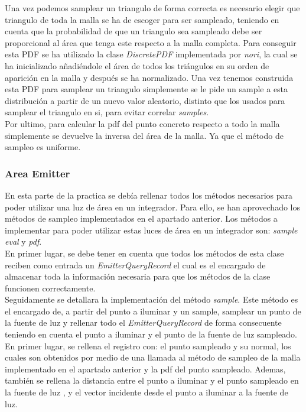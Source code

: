 \documentclass[10pt,oneside,a4paper]{article}
\begin{document}
Una vez podemos samplear un triangulo de forma correcta es necesario elegir que triangulo de toda la malla se ha de escoger para ser sampleado, teniendo en cuenta que la probabilidad de que un triangulo sea sampleado debe ser proporcional al área que tenga este respecto a la malla completa. Para conseguir esta PDF se ha utilizado la clase \textit{DiscretePDF} implementada por \textit{nori}, la cual se ha inicializado añadiéndole el área de todos los triángulos en su orden de aparición en la malla y después se ha normalizado. Una vez tenemos construida esta PDF para samplear un triangulo simplemente se le pide un sample a esta distribución a partir de un nuevo valor aleatorio, distinto que los usados para samplear el triangulo en si, para evitar correlar\textit{ samples}.\\

Por ultimo, para calcular la pdf del punto concreto respecto a todo la malla simplemente se devuelve la inversa del área de la malla. Ya que el método de sampleo es uniforme.
\subsubsection{Area Emitter}
En esta parte de la practica se debía rellenar todos los métodos necesarios para poder utilizar  una luz de área en un integrador. Para ello, se han aprovechado los métodos de sampleo implementados en el apartado anterior. Los  métodos a implementar para poder utilizar estas luces de área en un integrador son: \textit{sample} \textit{eval} y \textit{pdf}.\\

En primer lugar, se debe tener en cuenta que todos los métodos de esta clase reciben como entrada un \textit{EmitterQueryRecord} el cual es el encargado de almacenar toda la información necesaria para que los métodos de la clase funcionen correctamente.\\

Seguidamente se detallara la implementación del método \textit{sample}. Este método es el encargado de, a partir del punto a iluminar y un sample, samplear un punto de la fuente de luz y rellenar todo el \textit{EmitterQueryRecord} de forma consecuente teniendo en cuenta el punto a iluminar y el punto de la fuente de luz sampleado. En primer lugar, se rellena el registro con: el punto sampleado y su normal, los cuales son obtenidos por medio de una llamada al método de sampleo de la malla implementado en el apartado anterior y la pdf del punto sampleado. Ademas, también se rellena la distancia entre el punto a iluminar y el punto sampleado en la fuente de luz , y el vector incidente desde el punto a iluminar a la fuente de luz.\\
\end{document}
